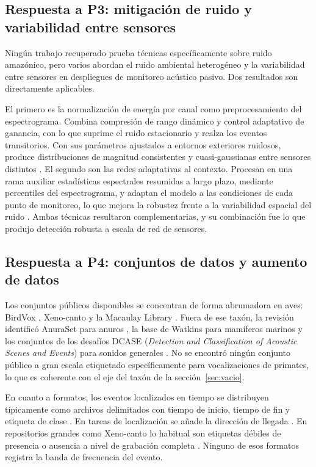 \subsection{Respuesta a P3: mitigación de ruido y variabilidad entre sensores}

Ningún trabajo recuperado prueba técnicas específicamente sobre ruido amazónico,
pero varios abordan el ruido ambiental heterogéneo y la variabilidad entre
sensores en despliegues de monitoreo acústico pasivo. Dos resultados son
directamente aplicables.

El primero es la normalización de energía por canal como preprocesamiento del
espectrograma. Combina compresión de rango dinámico y control adaptativo de
ganancia, con lo que suprime el ruido estacionario y realza los eventos
transitorios. Con sus parámetros ajustados a entornos exteriores ruidosos, produce
distribuciones de magnitud consistentes y cuasi-gaussianas entre sensores
distintos \citep{lostanlen_robust_2019}. El segundo son las redes adaptativas al
contexto. Procesan en una rama auxiliar estadísticas espectrales resumidas a largo
plazo, mediante percentiles del espectrograma, y adaptan el modelo a las
condiciones de cada punto de monitoreo, lo que mejora la robustez frente a la
variabilidad espacial del ruido \citep{lostanlen_robust_2019}. Ambas técnicas
resultaron complementarias, y su combinación fue lo que produjo detección robusta
a escala de red de sensores.

\subsection{Respuesta a P4: conjuntos de datos y aumento de datos}

Los conjuntos públicos disponibles se concentran de forma abrumadora en aves:
BirdVox \citep{lostanlen_birdvox_2018}, Xeno-canto
\citep{Willem-Pier_Vellinga_2026} y la Macaulay Library
\citep{macaulay_library}. Fuera de ese taxón, la revisión identificó AnuraSet
para anuros \citep{canas_anuraset_2023}, la base de Watkins para mamíferos
marinos \citep{sayigh_watkins_2016} y los conjuntos de los desafíos DCASE
(\textit{Detection and Classification of Acoustic Scenes and Events}) para
sonidos generales \citep{politis_dataset_2020,nolasco_learning_2023}. No se encontró ningún conjunto
público a gran escala etiquetado específicamente para vocalizaciones de
primates, lo que es coherente con el eje del taxón de la
sección~\ref{sec:vacio}.

En cuanto a formatos, los eventos localizados en tiempo se distribuyen
típicamente como archivos delimitados con tiempo de inicio, tiempo de fin y
etiqueta de clase \citep{nolasco_learning_2023}. En tareas de localización se
añade la dirección de llegada \citep{politis_dataset_2020}. En repositorios
grandes como Xeno-canto lo habitual son etiquetas débiles de presencia o
ausencia a nivel de grabación completa \citep{kahl_birdnet_2021}. Ninguno de
esos formatos registra la banda de frecuencia del evento.

